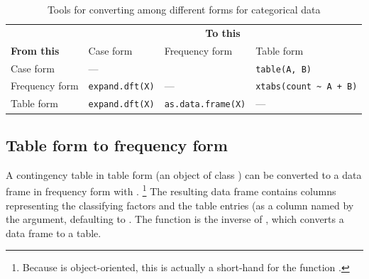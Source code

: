 \documentclass[10pt,krantz2]{krantz}\usepackage[]{graphicx}\usepackage[]{color}
\begin{document}
\begin{table}[htb]
 \caption{Tools for converting among different forms for categorical data}\label{tab:convert}
 \newsavebox{\adfxtabs}
 \begin{center}
   \begin{tabular}{l|lll}
  \hline
                 & \multicolumn{3}{c}{\textbf{To this}} \\
	\textbf{From this}      &     Case form         & Frequency form             &  Table form \\
	\hline
  Case form      &  ---                   & \usebox{\adfxtabs}  &  \verb|table(A, B)|  \\
	Frequency form &  \verb|expand.dft(X)|  & ---   & \verb|xtabs(count ~ A + B)|\\
	Table form     &  \verb|expand.dft(X)|  & \verb|as.data.frame(X)|   &  ---     \\
	\hline
   \end{tabular}
 \end{center}
\end{table}

\subsection{Table form to frequency form}
A contingency table in table form (an object of class ) can be converted
to a data frame in frequency form with .%
\footnote{
Because \R is object-oriented, this is actually a short-hand for
the function .
}
The resulting
data frame contains columns
representing the classifying factors and the table entries (as a column named by
the  argument, defaulting to .  The function
 is the inverse of , which converts a data frame to a table.
\end{document}
